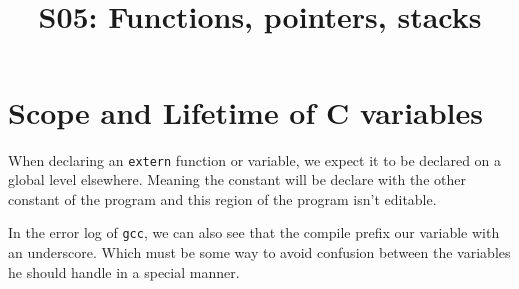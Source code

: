 


\title{
    \unilogo[0.3\textwidth]\\[0.9cm]
    S05: Functions, pointers, stacks
}

\author{\thestudent\theprof}
\lhead{\unilogo}
\rhead{\thestudent\\\theseriesnumber}


% 


\pgfplotsset{compat=newest}

\lstset{
    language=C,
    basicstyle=\footnotesize,
    stepnumber=3,
    firstnumber=1,
}

\raggedbottom %


\maketitle
\section*{\theseriesnumber}

%
%
\section{Scope and Lifetime of C variables}


When declaring an \verb!extern! function or variable, we expect it to be declared on a global level elsewhere. Meaning the constant will be declare with the other constant of the program and this region of the program isn't editable.

In the error log of \verb!gcc!, we can also see that the compile prefix our variable with an underscore.
Which must be some way to avoid confusion between the variables he should handle in a special manner.

